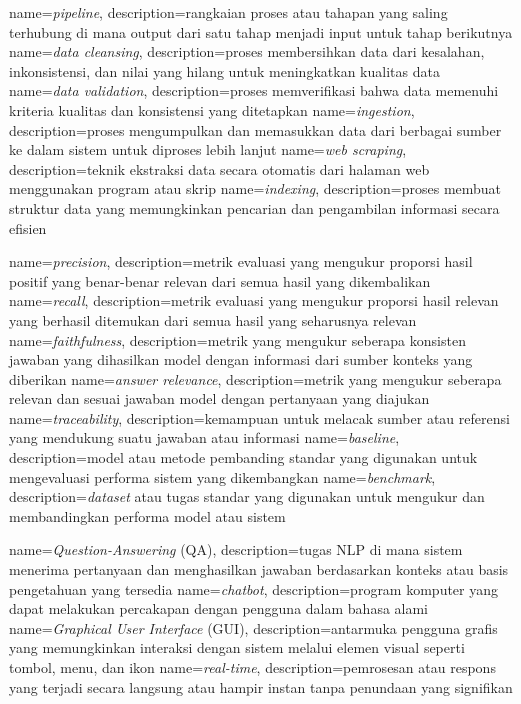 {
	name={\textit{pipeline}},
	description={rangkaian proses atau tahapan yang saling terhubung di mana output dari satu tahap menjadi input untuk tahap berikutnya}
}
{
	name={\textit{data cleansing}},
	description={proses membersihkan data dari kesalahan, inkonsistensi, dan nilai yang hilang untuk meningkatkan kualitas data}
}
{
	name={\textit{data validation}},
	description={proses memverifikasi bahwa data memenuhi kriteria kualitas dan konsistensi yang ditetapkan}
}
{
	name={\textit{ingestion}},
	description={proses mengumpulkan dan memasukkan data dari berbagai sumber ke dalam sistem untuk diproses lebih lanjut}
}
{
	name={\textit{web scraping}},
	description={teknik ekstraksi data secara otomatis dari halaman web menggunakan program atau skrip}
}
{
	name={\textit{indexing}},
	description={proses membuat struktur data yang memungkinkan pencarian dan pengambilan informasi secara efisien}
}

{
	name={\textit{precision}},
	description={metrik evaluasi yang mengukur proporsi hasil positif yang benar-benar relevan dari semua hasil yang dikembalikan}
}
{
	name={\textit{recall}},
	description={metrik evaluasi yang mengukur proporsi hasil relevan yang berhasil ditemukan dari semua hasil yang seharusnya relevan}
}
{
	name={\textit{faithfulness}},
	description={metrik yang mengukur seberapa konsisten jawaban yang dihasilkan model dengan informasi dari sumber konteks yang diberikan}
}
{
	name={\textit{answer relevance}},
	description={metrik yang mengukur seberapa relevan dan sesuai jawaban model dengan pertanyaan yang diajukan}
}
{
	name={\textit{traceability}},
	description={kemampuan untuk melacak sumber atau referensi yang mendukung suatu jawaban atau informasi}
}
{
	name={\textit{baseline}},
	description={model atau metode pembanding standar yang digunakan untuk mengevaluasi performa sistem yang dikembangkan}
}
{
	name={\textit{benchmark}},
	description={\textit{dataset} atau tugas standar yang digunakan untuk mengukur dan membandingkan performa model atau sistem}
}

{
	name={\textit{Question-Answering} (QA)},
	description={tugas NLP di mana sistem menerima pertanyaan dan menghasilkan jawaban berdasarkan konteks atau basis pengetahuan yang tersedia}
}
{
	name={\textit{chatbot}},
	description={program komputer yang dapat melakukan percakapan dengan pengguna dalam bahasa alami}
}
{
	name={\textit{Graphical User Interface} (GUI)},
	description={antarmuka pengguna grafis yang memungkinkan interaksi dengan sistem melalui elemen visual seperti tombol, menu, dan ikon}
}
{
	name={\textit{real-time}},
	description={pemrosesan atau respons yang terjadi secara langsung atau hampir instan tanpa penundaan yang signifikan}
}

